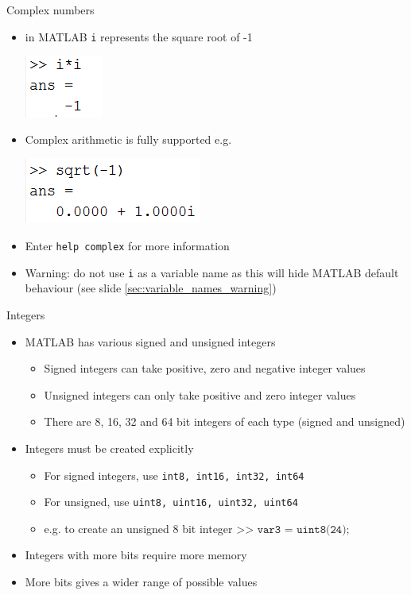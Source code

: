 \documentclass{beamer}
\begin{document}
\begin{frame}{Complex numbers}
	\begin{itemize}
		\item in MATLAB \texttt{i} represents the square root of -1
		
		\includegraphics[scale=0.7]{i_squared}
		\item Complex arithmetic is fully supported e.g.
		
		\includegraphics[scale=0.7]{sqrt-1}
		\item Enter \texttt{help complex} for more information
		\item Warning: do not use \texttt{i} as a variable name as this will hide MATLAB default behaviour (see slide \ref{sec:variable_names_warning})
	\end{itemize}
\end{frame}


\begin{frame}{Integers}
	\begin{itemize}
		\item MATLAB has various signed and unsigned integers
		\begin{itemize}
			\item Signed integers can take positive, zero and negative integer values
			\item Unsigned integers can only take positive and zero integer values
			\item There are 8, 16, 32 and 64 bit integers of each type (signed and unsigned)
		\end{itemize}
		\item Integers must be created explicitly
		\begin{itemize}
			\item For signed integers, use \texttt{int8, int16, int32, int64}
			\item For unsigned, use \texttt{uint8, uint16, uint32, uint64}
			\item e.g. to create an unsigned 8 bit integer
				$\texttt{>> var3 = uint8(24);}$
		\end{itemize}
		
		\item Integers with more bits require more memory
		\item More bits gives a wider range of possible values
	\end{itemize}
\end{frame}
\end{document}
